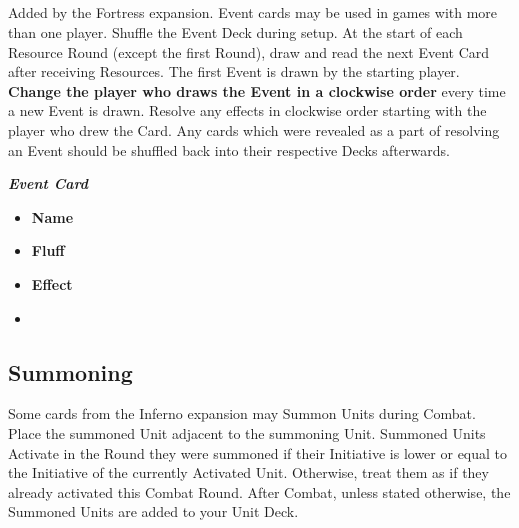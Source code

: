 \begin{multicols*}{2}
\subsection*{}
Added by the Fortress expansion.
Event cards may be used in games with more than one player.
Shuffle the Event Deck during setup.
At the start of each Resource Round (except the first Round), draw and read the next Event Card after receiving Resources.
The first Event is drawn by the starting player.
\textbf{Change the player who draws the Event in a clockwise order} every time a new Event is drawn.
Resolve any effects in clockwise order starting with the player who drew the Card.
Any cards which were revealed as a part of resolving an Event should be shuffled back into their respective Decks afterwards.

\medskip

\begin{minipage}[h]{\linewidth}
  \vspace{0pt}
  \centering
  \begin{scriptsize}
  \end{scriptsize}
  \footnotesize{\textbf{\textit{\textcolor{darkcandyapplered}{Event Card}}}}
  \scriptsize
  \begin{multicols}{2}
    \begin{itemize}
      \item[\textbf{1.}] \textbf{Name}
      \item[\textbf{2.}] \textbf{Fluff}
      \item[\textbf{3.}] \textbf{Effect}
      \item[\textbf{\phantom{.}}] \phantom{.}
    \end{itemize}
  \end{multicols}
\end{minipage}

\subsection*{Summoning}
Some cards from the Inferno expansion may Summon Units during Combat.
Place the summoned Unit adjacent to the summoning Unit.
Summoned Units Activate in the Round they were summoned if their Initiative is lower or equal to the Initiative of the currently Activated Unit.
Otherwise, treat them as if they already activated this Combat Round.
After Combat, unless stated otherwise, the Summoned Units are added to your Unit Deck.


\end{multicols*}
